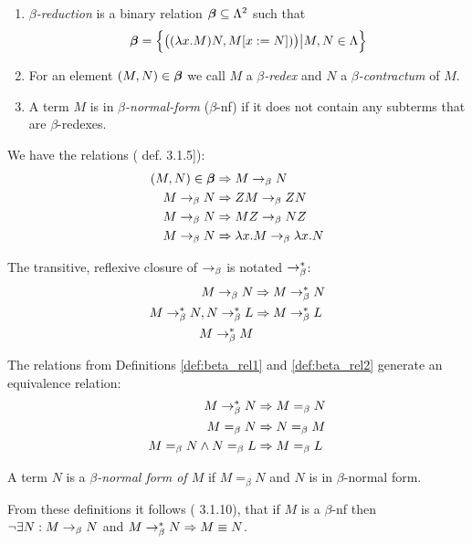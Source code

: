 \begin{definition}
	\begin{enumerate}
		\item \emph{$\beta$-reduction} is a binary relation $\boldsymbol\beta\subseteq\Lambda^2$ such that
		\begin{equation*}
			\boldsymbol\beta=\Big\{\big((\lambda x.M)N,M[x:=N])\big)\big|M,N\in\Lambda\Big\}
		\end{equation*}
		\item For an element $(M,N)\in\boldsymbol\beta$ we call $M$ a \emph{$\beta$-redex} and
		$N$ a \emph{$\beta$-contractum} of $M$.
		\item A term $M$ is in \emph{$\beta$-normal-form} ($\beta$-nf) if it 
		does not contain any subterms that are $\beta$-redexes.
	\end{enumerate}
\end{definition}

\begin{definition}\label{def:beta_rel1}
	We have the relations (\cite{Barendregt} def. 3.1.5]):
	\begin{align*}
		(M,N)\in\boldsymbol\beta&\Rightarrow M\rightarrow_\beta N \\
		M\rightarrow_\beta N &\Rightarrow ZM\rightarrow_\beta ZN \\
		M\rightarrow_\beta N &\Rightarrow MZ\rightarrow_\beta NZ \\
		M\rightarrow_\beta N &\Rightarrow \lambda x.M\rightarrow_\beta \lambda x.N 
	\end{align*}	
\end{definition}
\begin{definition}\label{def:beta_rel2}
	The transitive, reflexive closure of $\rightarrow_\beta$ is notated $\rightarrow_\beta^*$:
	\begin{align*}
		M\rightarrow_\beta N &\Rightarrow M\rightarrow_\beta^* N \\
		M\rightarrow_\beta^* N, N\rightarrow_\beta^* L &\Rightarrow M\rightarrow_\beta^* L \\
		M\rightarrow_\beta^* M & 
	\end{align*}
\end{definition}
\begin{definition}
	The relations from Definitions \ref{def:beta_rel1} and \ref{def:beta_rel2} 
	generate an equivalence relation:
	\begin{align*}
		M\rightarrow_\beta^* N &\Rightarrow M=_\beta N \\
		M=_\beta N &\Rightarrow N=_\beta M \\
		M=_\beta N\wedge N=_\beta L&\Rightarrow M=_\beta L
	\end{align*}	
\end{definition}
\begin{definition}
	A term $N$ is a \emph{$\beta$-normal form of $M$} if $M=_\beta N$ and $N$ is in $\beta$-normal form.
\end{definition}
From these definitions it follows (\cite{Barendregt} 3.1.10), that if $M$ is a
$\beta$-nf then $\neg\exists N:M\rightarrow_\beta N$ and $M\rightarrow_\beta^* N\Rightarrow M\equiv N$.

